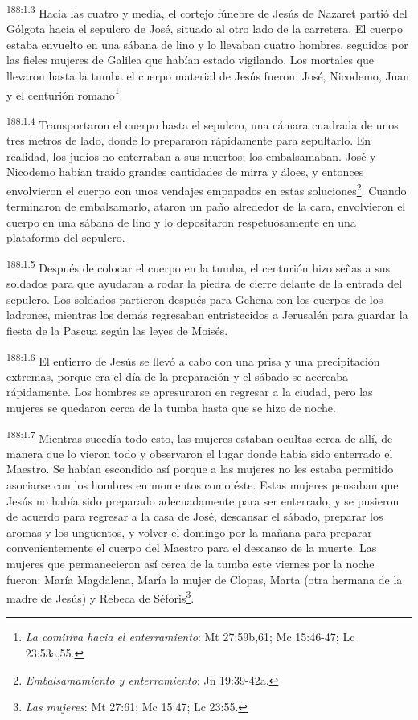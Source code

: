 \par 
\textsuperscript{188:1.3} Hacia las cuatro y media, el cortejo fúnebre de Jesús de Nazaret partió del Gólgota hacia el sepulcro de José, situado al otro lado de la carretera. El cuerpo estaba envuelto en una sábana de lino y lo llevaban cuatro hombres, seguidos por las fieles mujeres de Galilea que habían estado vigilando. Los mortales que llevaron hasta la tumba el cuerpo material de Jesús fueron: José, Nicodemo, Juan y el centurión romano\footnote{\textit{La comitiva hacia el enterramiento}: Mt 27:59b,61; Mc 15:46-47; Lc 23:53a,55.}.

\par 
\textsuperscript{188:1.4} Transportaron el cuerpo hasta el sepulcro, una cámara cuadrada de unos tres metros de lado, donde lo prepararon rápidamente para sepultarlo. En realidad, los judíos no enterraban a sus muertos; los embalsamaban. José y Nicodemo habían traído grandes cantidades de mirra y áloes, y entonces envolvieron el cuerpo con unos vendajes empapados en estas soluciones\footnote{\textit{Embalsamamiento y enterramiento}: Jn 19:39-42a.}. Cuando terminaron de embalsamarlo, ataron un paño alrededor de la cara, envolvieron el cuerpo en una sábana de lino y lo depositaron respetuosamente en una plataforma del sepulcro.

\par 
\textsuperscript{188:1.5} Después de colocar el cuerpo en la tumba, el centurión hizo señas a sus soldados para que ayudaran a rodar la piedra de cierre delante de la entrada del sepulcro. Los soldados partieron después para Gehena con los cuerpos de los ladrones, mientras los demás regresaban entristecidos a Jerusalén para guardar la fiesta de la Pascua según las leyes de Moisés.

\par 
\textsuperscript{188:1.6} El entierro de Jesús se llevó a cabo con una prisa y una precipitación extremas, porque era el día de la preparación y el sábado se acercaba rápidamente. Los hombres se apresuraron en regresar a la ciudad, pero las mujeres se quedaron cerca de la tumba hasta que se hizo de noche.

\par 
\textsuperscript{188:1.7} Mientras sucedía todo esto, las mujeres estaban ocultas cerca de allí, de manera que lo vieron todo y observaron el lugar donde había sido enterrado el Maestro. Se habían escondido así porque a las mujeres no les estaba permitido asociarse con los hombres en momentos como éste. Estas mujeres pensaban que Jesús no había sido preparado adecuadamente para ser enterrado, y se pusieron de acuerdo para regresar a la casa de José, descansar el sábado, preparar los aromas y los ung\"uentos, y volver el domingo por la mañana para preparar convenientemente el cuerpo del Maestro para el descanso de la muerte. Las mujeres que permanecieron así cerca de la tumba este viernes por la noche fueron: María Magdalena, María la mujer de Clopas, Marta (otra hermana de la madre de Jesús) y Rebeca de Séforis\footnote{\textit{Las mujeres}: Mt 27:61; Mc 15:47; Lc 23:55.}.

